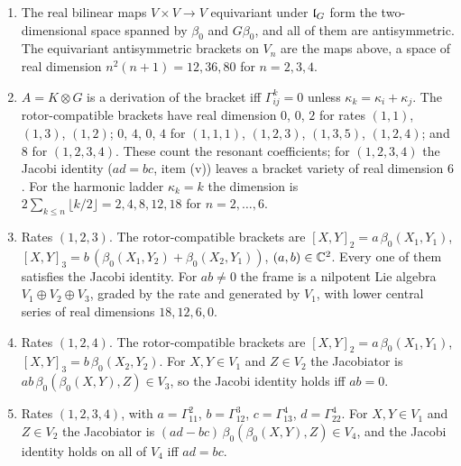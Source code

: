 \begin{proposition}
\label{e4:prop:rotor}
\begin{enumerate}[label=(\roman*),leftmargin=2.2em]
\item The real bilinear maps $V\times V\to V$ equivariant under $\mathfrak l_G$ form the two-dimensional space spanned by $\beta_0$ and $G\beta_0$, and all of them
are antisymmetric. The equivariant antisymmetric brackets on $V_n$ are the maps above, a space of real dimension $n^2(n+1)=12,36,80$ for $n=2,3,4$.
\item $A=K\otimes G$ is a derivation of the bracket iff $\Gamma^k_{ij}=0$ unless $\kappa_k=\kappa_i+\kappa_j$. The rotor-compatible brackets have real dimension
$0$, $0$, $2$ for rates $(1,1)$, $(1,3)$, $(1,2)$; $0$, $4$, $0$, $4$ for $(1,1,1)$, $(1,2,3)$, $(1,3,5)$, $(1,2,4)$; and $8$ for $(1,2,3,4)$. These count the
resonant coefficients; for $(1,2,3,4)$ the Jacobi identity ($ad=bc$, item (v)) leaves a bracket variety of real dimension $6$. For the
harmonic ladder $\kappa_k=k$ the dimension is $2\sum_{k\le n}\lfloor k/2\rfloor=2,4,8,12,18$ for $n=2,\dots,6$.
\item Rates $(1,2,3)$. The rotor-compatible brackets are $[X,Y]_2=a\,\beta_0(X_1,Y_1)$, $[X,Y]_3=b\,(\beta_0(X_1,Y_2)+\beta_0(X_2,Y_1))$, $(a,b)\in\mathbb{C}^2$. Every one of them
satisfies the Jacobi identity. For $ab\neq0$ the frame is a nilpotent Lie algebra $V_1\oplus V_2\oplus V_3$, graded by the rate and generated by $V_1$, with
lower central series of real dimensions $18,12,6,0$.
\item Rates $(1,2,4)$. The rotor-compatible brackets are $[X,Y]_2=a\,\beta_0(X_1,Y_1)$, $[X,Y]_3=b\,\beta_0(X_2,Y_2)$. For $X,Y\in V_1$ and $Z\in V_2$ the
Jacobiator is $ab\,\beta_0(\beta_0(X,Y),Z)\in V_3$, so the Jacobi identity holds iff $ab=0$.
\item Rates $(1,2,3,4)$, with $a=\Gamma^2_{11}$, $b=\Gamma^3_{12}$, $c=\Gamma^4_{13}$, $d=\Gamma^4_{22}$. For $X,Y\in V_1$ and $Z\in V_2$ the Jacobiator is
$(ad-bc)\,\beta_0(\beta_0(X,Y),Z)\in V_4$, and the Jacobi identity holds on all of $V_4$ iff $ad=bc$.
\end{enumerate}
\end{proposition}

